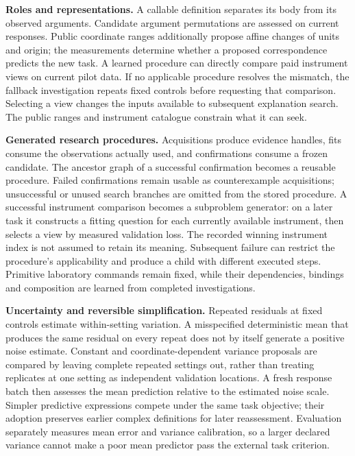 \documentclass[twoside,11pt]{article}
\begin{document}
\textbf{Roles and representations.} A callable definition separates its body from its
observed arguments. Candidate argument permutations are assessed on current
responses. Public coordinate ranges additionally propose affine changes of
units and origin; the measurements determine whether a proposed correspondence
predicts the new task. A learned procedure can directly compare paid instrument
views on current pilot data. If no applicable procedure resolves the mismatch,
the fallback investigation repeats fixed controls before requesting that
comparison. Selecting a view changes the inputs available to subsequent
explanation search. The public ranges and instrument catalogue constrain what
it can seek.


\textbf{Generated research procedures.} Acquisitions produce evidence handles, fits
consume the observations actually used, and confirmations consume a frozen
candidate. The ancestor graph of a successful confirmation becomes a reusable
procedure. Failed confirmations remain usable as counterexample acquisitions;
unsuccessful or unused search branches are omitted from the stored procedure.
A successful instrument comparison becomes a subproblem generator: on a later
task it constructs a fitting question for each currently available instrument,
then selects a view by measured validation loss. The recorded winning instrument
index is not assumed to retain its meaning. Subsequent failure can restrict the
procedure's applicability and produce a child with different executed steps.
Primitive laboratory commands remain fixed, while their dependencies, bindings
and composition are learned from completed investigations.


\textbf{Uncertainty and reversible simplification.} Repeated residuals at fixed
controls estimate within-setting variation. A misspecified deterministic mean
that produces the same residual on every repeat does not by itself generate a
positive noise estimate. Constant and coordinate-dependent variance proposals
are compared by leaving complete repeated settings out, rather than treating
replicates at one setting as independent validation locations. A fresh response
batch then assesses the mean prediction relative to the estimated noise scale.
Simpler predictive expressions compete under the same task objective; their
adoption preserves earlier complex definitions for later reassessment. Evaluation
separately measures mean error and variance calibration, so a larger declared
variance cannot make a poor mean predictor pass the external task criterion.
\end{document}
